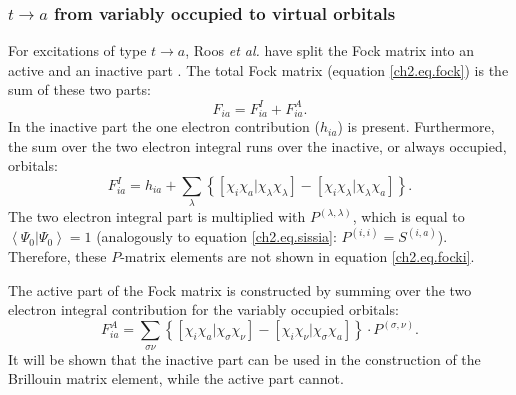 \subsubsection{\label{ch2.sec.t-a}$t \rightarrow a$ from variably occupied to virtual orbitals}

For excitations of type $t \rightarrow a$, Roos \textit{et al.} have split the Fock matrix into an active and an inactive part \cite{roos1}. The total Fock matrix (equation \ref{ch2.eq.fock}) is the sum of these two parts:
\begin{equation}
F_{ia}=F^{I}_{ia} + F^{A}_{ia}.
\label{ch2.eq.focksum}
\end{equation}
In the inactive part the one electron contribution ($h_{ia}$) is present. Furthermore, the sum over the two electron integral runs over the inactive, or always occupied, orbitals:
\begin{equation}
F^{I}_{ia} = h_{ia} + \sum_{\lambda} \left\{ \left[ \chi_i \chi_a | \chi_\lambda \chi_\lambda \right] - \left[ \chi_i \chi_\lambda | \chi_\lambda \chi_a \right] \right\}.
\label{ch2.eq.focki}
\end{equation}
The two electron integral part is multiplied with $P^{(\lambda,\lambda)}$, which is equal to $\left<\Psi_0 | \Psi_0 \right> = 1$ (analogously to equation \ref{ch2.eq.sissia}: $P^{(i,i)}=S^{(i,a)}$). Therefore, these $P$-matrix elements are not shown in equation \ref{ch2.eq.focki}. 

The active part of the Fock matrix is constructed by summing over the two electron integral contribution for the variably occupied orbitals:
\begin{equation}
F^{A}_{ia} = \sum_{\sigma\nu} \left\{ \left[ \chi_i \chi_a | \chi_\sigma \chi_\nu \right] - \left[ \chi_i \chi_\nu | \chi_\sigma \chi_a \right] \right\} \cdot P^{(\sigma,\nu)}.
\label{ch2.eq.focka}
\end{equation}
It will be shown that the inactive part can be used in the construction of the Brillouin matrix element, while the active part cannot.

